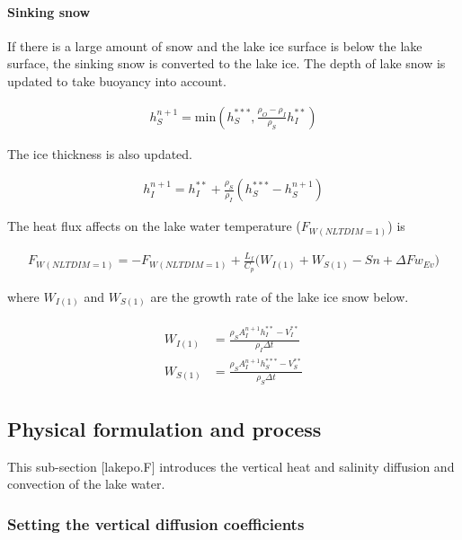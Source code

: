 \paragraph{Sinking snow}\label{sinking-snow}

If there is a large amount of snow and the lake ice surface is below the lake surface, the sinking snow is converted to the lake ice. The depth of lake snow is updated to take buoyancy into account.

\begin{eqnarray}
    h_S^{n+1} = \mathrm{min}(h_S^{\ast\ast\ast}, \frac{\rho_O-\rho_I}{\rho_S}h_I^{\ast\ast})
\end{eqnarray}

The ice thickness is also updated.

\begin{eqnarray}
    h_I^{n+1} = h_I^{\ast\ast} + \frac{\rho_S}{\rho_I} (h_S^{\ast\ast\ast}-h_S^{n+1})
\end{eqnarray}

The heat flux affects on the lake water temperature (\(F_{W(NLTDIM=1)}\)) is

\begin{eqnarray}
    F_{W(NLTDIM=1)} = - F_{W(NLTDIM=1)} + \frac{L_f}{C_p} \Big(W_{I(1)}+W_{S(1)}-Sn + \Delta Fw_{Ev}\Big)
\end{eqnarray}

where \(W_{I(1)}\) and \(W_{S(1)}\) are the growth rate of the lake ice snow below.

\begin{eqnarray}
\begin{array}{rl}
    W_{I(1)} &= \frac{\rho_S A_I^{n+1} h_I^{\ast\ast} - V_I^{\ast\ast}}{\rho_I \Delta t} \\
  W_{S(1)} &= \frac{\rho_S A_I^{n+1} h_S^{\ast\ast\ast} - V_S^{\ast\ast}}{\rho_S \Delta t}
\end{array}
\end{eqnarray}

\subsection{Physical formulation and process}\label{physical-formulation-and-process}

This sub-section {[}lakepo.F{]} introduces the vertical heat and salinity diffusion and convection of the lake water.

\subsubsection{Setting the vertical diffusion coefficients}\label{setting-the-vertical-diffusion-coefficients}

